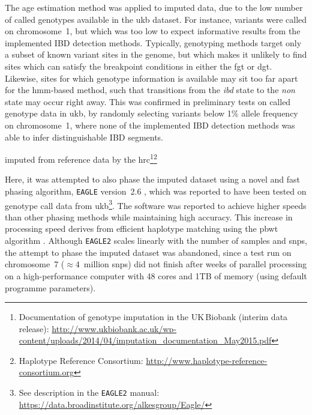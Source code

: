 The age estimation method was applied to imputed data, due to the low number of called genotypes available in the \gls{ukb} dataset.
For instance,  variants were called on chromosome~1, but which was too low to expect informative results from the implemented IBD detection methods.
Typically, genotyping methods target only a subset of known variant sites in the genome, but which makes it unlikely to find sites which can satisfy the breakpoint conditions in either the \gls{fgt} or \gls{dgt}.
Likewise, sites for which genotype information is available may sit too far apart for the \gls{hmm}-based method, such that transitions from the \emph{ibd} state to the \emph{non} state may occur right away.
This was confirmed in preliminary tests on called genotype data in \gls{ukb}, by randomly selecting  variants below 1\% allele frequency on chromosome~1, where none of the implemented IBD detection methods was able to infer distinguishable IBD segments.


imputed from reference data by the \gls{hrc}\footnote{Documentation of genotype imputation in the UK\,Biobank (interim data release): \url{http://www.ukbiobank.ac.uk/wp-content/uploads/2014/04/imputation_documentation_May2015.pdf} }\footnote{Haplotype Reference Consortium: \url{http://www.haplotype-reference-consortium.org} }




%

%


Here, it was attempted to also phase the imputed dataset using a novel and fast phasing algorithm, \texttt{EAGLE} version~2.6 \citep{loh2016fast,Loh:2016bl}, which was reported to have been tested on genotype call data from \gls{ukb}\footnote{See description in the \texttt{EAGLE2} manual: \url{https://data.broadinstitute.org/alkesgroup/Eagle/} }.
The software was reported to achieve higher speeds than other phasing methods while maintaining high accuracy.
This increase in processing speed derives from efficient haplotype matching
using the \gls{pbwt} algorithm \citep{Durbin:2014de}.
Although \texttt{EAGLE2} scales linearly with the number of samples and \glspl{snp}, the attempt to phase the imputed dataset was abandoned, since a test run on chromosome~7 (${\approx 4}$~million \glspl{snp}) did not finish after  weeks of parallel processing on a high-performance computer with 48 cores and 1TB of memory (using default programme parameters).




